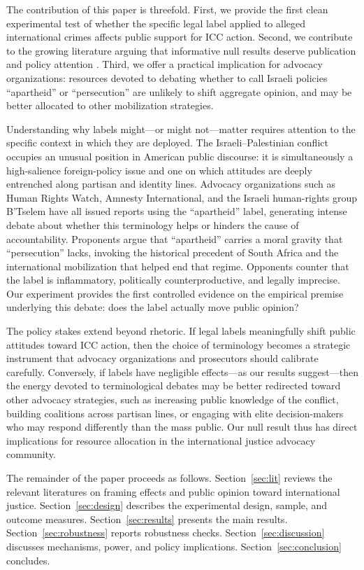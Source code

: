 \documentclass[12pt]{article}
\begin{document}
The contribution of this paper is threefold. First, we provide the first clean experimental test of whether the specific legal label applied to alleged international crimes affects public support for ICC action. Second, we contribute to the growing literature arguing that informative null results deserve publication and policy attention \citep{lakens2017equivalence}. Third, we offer a practical implication for advocacy organizations: resources devoted to debating whether to call Israeli policies ``apartheid'' or ``persecution'' are unlikely to shift aggregate opinion, and may be better allocated to other mobilization strategies.

Understanding why labels might---or might not---matter requires attention to the specific context in which they are deployed. The Israeli--Palestinian conflict occupies an unusual position in American public discourse: it is simultaneously a high-salience foreign-policy issue and one on which attitudes are deeply entrenched along partisan and identity lines. Advocacy organizations such as Human Rights Watch, Amnesty International, and the Israeli human-rights group B'Tselem have all issued reports using the ``apartheid'' label, generating intense debate about whether this terminology helps or hinders the cause of accountability. Proponents argue that ``apartheid'' carries a moral gravity that ``persecution'' lacks, invoking the historical precedent of South Africa and the international mobilization that helped end that regime. Opponents counter that the label is inflammatory, politically counterproductive, and legally imprecise. Our experiment provides the first controlled evidence on the empirical premise underlying this debate: does the label actually move public opinion?

The policy stakes extend beyond rhetoric. If legal labels meaningfully shift public attitudes toward ICC action, then the choice of terminology becomes a strategic instrument that advocacy organizations and prosecutors should calibrate carefully. Conversely, if labels have negligible effects---as our results suggest---then the energy devoted to terminological debates may be better redirected toward other advocacy strategies, such as increasing public knowledge of the conflict, building coalitions across partisan lines, or engaging with elite decision-makers who may respond differently than the mass public. Our null result thus has direct implications for resource allocation in the international justice advocacy community.

The remainder of the paper proceeds as follows. Section~\ref{sec:lit} reviews the relevant literatures on framing effects and public opinion toward international justice. Section~\ref{sec:design} describes the experimental design, sample, and outcome measures. Section~\ref{sec:results} presents the main results. Section~\ref{sec:robustness} reports robustness checks. Section~\ref{sec:discussion} discusses mechanisms, power, and policy implications. Section~\ref{sec:conclusion} concludes.
\end{document}
